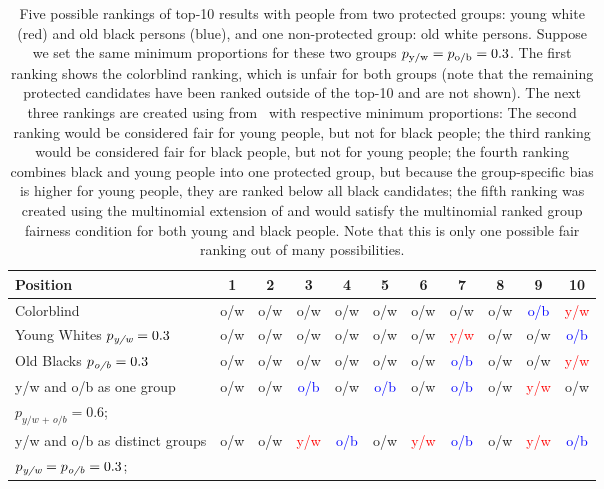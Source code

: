 \begin{table}[t]
	\caption[Introductory example for the extension of \algoFAIR to multiple protected groups]{Five possible rankings of top-10 results with people from two protected groups: young white (red) and old black persons (blue), and one non-protected group: old white persons.
	Suppose we set the same minimum proportions for these two groups $p_{\text{y/w}} = p_{\text{o/b}} = 0.3$.
	The first ranking shows the colorblind ranking, which is unfair for both groups (note that the remaining protected candidates have been ranked outside of the top-10 and are not shown).
	The next three rankings are created using \algoFAIR from~\cite{zehlike2017fair} with respective minimum proportions:
	The second ranking would be considered fair for young people, but not for black people; the third ranking would be considered fair for black people, but not for young people; the fourth ranking combines black and young people into one protected group, but because the group-specific bias is higher for young people, they are ranked below all black candidates; the fifth ranking was created using the multinomial extension of \algoFAIR and would satisfy the multinomial ranked group fairness condition for both young and black people.
	Note that this is only one possible fair ranking out of many possibilities.
		\label{tbl:multinomial_intro_example}}
	\centering\begin{tabular}{lcccccccccc}\toprule
		Position & 1 &2 & 3 &4& 5& 6& 7& 8& 9& 10  \\
		\midrule
		\rowcolor[HTML]{C0C0C0}
		Colorblind & o/w & o/w & o/w & o/w & o/w & o/w & o/w & o/w & \textcolor{blue}{o/b} & \textcolor{red}{y/w} \\
		Young Whites $p_\textit{y/w}=0.3$ & o/w &o/w& o/w& o/w& o/w& o/w& \textcolor{red}{y/w}& o/w & o/w & \textcolor{blue}{o/b} \\
		\rowcolor[HTML]{C0C0C0}
		Old Blacks $p_\textit{o/b}=0.3$ & o/w &o/w &o/w& o/w &o/w &o/w& \textcolor{blue}{o/b}& o/w& o/w& \textcolor{red}{y/w} \\
		y/w and o/b as one group & o/w &o/w& \textcolor{blue}{o/b} & o/w& \textcolor{blue}{o/b}& o/w & \textcolor{blue}{o/b}& o/w& \textcolor{red}{y/w}& o/w \\
		$p_{\textit{y/w + o/b}}=0.6$; &&&&&&&&&&\\
		\rowcolor[HTML]{C0C0C0}
		y/w and o/b as distinct groups& o/w& o/w &\textcolor{red}{y/w}& \textcolor{blue}{o/b}& o/w& \textcolor{red}{y/w} &\textcolor{blue}{o/b}& o/w& \textcolor{red}{y/w}& \textcolor{blue}{o/b} \\
		\rowcolor[HTML]{C0C0C0}
		 $p_{\textit{y/w}} = p_{\textit{o/b}} = 0.3$; &&&&&&&&&&\\
		\bottomrule
	\end{tabular}
\end{table}

